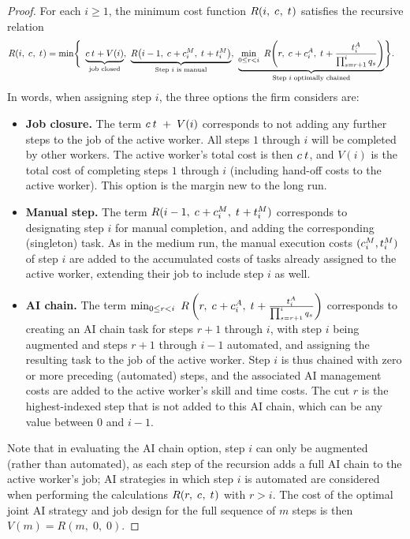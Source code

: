 \begin{proof}
For each $i \geq 1$, the minimum cost function $R(i,\; c_{},\; t_{})$ satisfies the recursive relation
\begin{align*}
R(i,\; \skillcost{},\; \timecost{}) = \min\Biggl\{
& \ \underbrace{\skillcost{}\,\timecost{} + V(i)}_{\text{job closed}}, \ \underbrace{R\bigl(i-1,\; \skillcost{} + \manualSkill{i},\; \timecost{} + \manualTime{i}\bigr)}_{\text{Step $i$ is manual}}, \ \underbrace{\min_{0 \le r < i}\ R\!\left(r,\; \skillcost{} + \AIskill{i},\; \timecost{} + \frac{\AItime{i}}{\prod_{s=r+1}^{i} q_s}\right)}_{\text{Step $i$ optimally chained}}
\Biggr\}.
\end{align*}
In words, when assigning step $i$, the three options the firm considers are:
\begin{itemize}
    \item \textbf{Job closure.}
    The term $c_{}\,t_{} \; + \; V(i)$ corresponds to not adding any further steps to the job of the active worker.
    All steps $1$ through $i$ will be completed by other workers.
    The active worker's total cost is then $c_{}\,t_{}$, and $V(i)$ is the total cost of completing steps $1$ through $i$ (including hand-off costs to the active worker).
    This option is the margin new to the long run.

    \item \textbf{Manual step.}
    The term $R(i-1,\; c_{} + c^{M}_{i},\; t_{} + t^{M}_{i})$ corresponds to designating step $i$ for manual completion, and adding the corresponding (singleton) task.
    As in the medium run, the manual execution costs $(c^{M}_{i}, t^{M}_{i})$ of step $i$ are added to the accumulated costs of tasks already assigned to the active worker, extending their job to include step $i$ as well.

    \item \textbf{AI chain.}
    The term $\min_{0 \le r < i} \ R\left(r,\; c_{} + c^{A}_{i},\; t_{} + \frac{t^{A}_{i}}{\prod_{s=r+1}^{i} q_s}\right)$ corresponds to creating an AI chain task for steps $r+1$ through $i$, with step $i$ being augmented and steps $r+1$ through $i-1$ automated, and assigning the resulting task to the job of the active worker.
    Step $i$ is thus chained with zero or more preceding (automated) steps, and the associated AI management costs are added to the active worker's skill and time costs.
    The cut $r$ is the highest-indexed step that is not added to this AI chain, which can be any value between $0$ and $i-1$.
\end{itemize}
Note that in evaluating the AI chain option, step $i$ can only be augmented (rather than automated), as each step of the recursion adds a full AI chain to the active worker's job; AI strategies in which step $i$ is automated are considered when performing the calculations $R(r,\; c_{},\; t_{})$ with $r > i$.
The cost of the optimal joint AI strategy and job design for the full sequence of $m$ steps is then $V(m) = R(m,\; 0,\; 0)$.


\end{proof}

